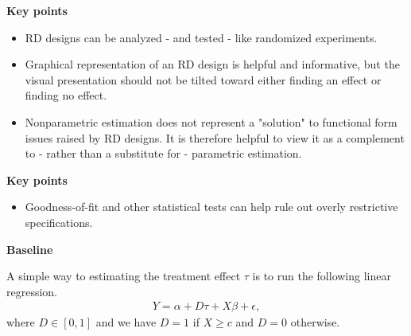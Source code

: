 \begin{frame}\textbf{Key points}\vspace{0.3cm}

\begin{itemize}\setlength\itemsep{1em}
\item RD designs can be analyzed - and tested - like randomized experiments.
\item Graphical representation of an RD design is helpful and informative, but the visual presentation should not be tilted toward either finding an effect or finding no effect.
\item Nonparametric estimation does not represent a "solution" to functional form issues raised by RD designs. It is therefore helpful to view it as a complement to - rather than a substitute for - parametric estimation.
\end{itemize}

\end{frame}
\begin{frame}\textbf{Key points}\vspace{0.3cm}

\begin{itemize}\setlength\itemsep{1em}
\item Goodness-of-fit and other statistical tests can help rule out overly restrictive specifications.
\end{itemize}

\end{frame}
\begin{frame}\textbf{Baseline}\vspace{0.3cm}

A simple way to estimating the treatment effect $\tau$ is to run the following linear regression.
%
\begin{align*}
Y = \alpha + D \tau + X \beta + \epsilon,
\end{align*}
where $D \in [0, 1]$ and we have $D = 1$ if $X \geq c$ and $D=0$ otherwise.
\end{frame}
